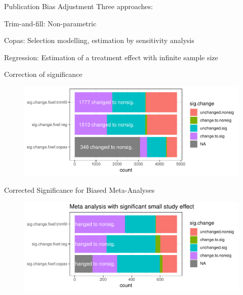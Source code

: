 \documentclass[english]{beamer}\usepackage[]{graphicx}\usepackage[]{color}
\makeatletter
\def\maxwidth{ %
  \ifdim\Gin@nat@width>\linewidth
    \linewidth
  \else
    \Gin@nat@width
  \fi
}
\newenvironment{knitrout}{}{} %
\makeatother
\begin{document}
\begin{frame}{Publication Bias Adjustment}
Three approaches:

Trim-and-fill: Non-parametric

Copas: Selection modelling, estimation by sensitivity analysis

Regression: Estimation of a treatment effect with infinite sample size
\end{frame}

\begin{frame}{Correction of significance}

\begin{figure}[fragile]
\begin{knitrout}
\color{fgcolor}
\includegraphics[width=\maxwidth]{figure/unnamed-chunk-7-1} 

\end{knitrout}
\end{figure}
\end{frame}

\begin{frame}{Corrected Significance for Biased Meta-Analyses}

\begin{figure}[fragile]
\begin{knitrout}
\color{fgcolor}
\includegraphics[width=\maxwidth]{figure/unnamed-chunk-8-1} 

\end{knitrout}
\end{figure}

\end{frame}
\end{document}
